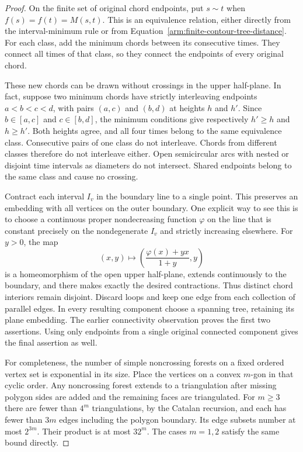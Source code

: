 \begin{proof}
On the finite set of original chord endpoints, put $s\sim t$ when
$f(s)=f(t)=M(s,t)$.  This is an equivalence relation, either directly
from the interval-minimum rule or from
Equation~\eqref{arm:finite-contour-tree-distance}.  For each class, add
the minimum chords between its consecutive times.  They connect all
times of that class, so they connect the endpoints of every original
chord.

These new chords can be drawn without crossings in the upper half-plane.
In fact, suppose two minimum chords have strictly interleaving endpoints
$a<b<c<d$, with pairs $(a,c)$ and $(b,d)$ at heights $h$ and $h'$.  Since
$b\in[a,c]$ and $c\in[b,d]$, the minimum conditions give respectively
$h'\ge h$ and $h\ge h'$.  Both heights agree, and all four times belong
to the same equivalence class.  Consecutive pairs of one class do not
interleave.  Chords from different classes therefore do not interleave
either.  Open semicircular arcs with nested or disjoint time intervals
as diameters do not intersect.  Shared
endpoints belong to the same class and cause no crossing.

Contract each interval $I_v$ in the boundary line to a single point.
This preserves an embedding with all vertices on the outer boundary.
One explicit way to see this is to choose a continuous proper
nondecreasing function $\varphi$ on the line that is constant precisely
on the nondegenerate $I_v$ and strictly increasing elsewhere.  For
$y>0$, the map
\[
 (x,y)\longmapsto
 \left(\frac{\varphi(x)+yx}{1+y},y\right)
\]
is a homeomorphism of the open upper half-plane, extends continuously
to the boundary, and there makes exactly the desired contractions.
Thus distinct chord interiors remain disjoint.  Discard loops and keep
one edge from each collection of parallel edges.  In every resulting
component choose a spanning tree, retaining its plane embedding.  The
earlier connectivity observation proves the first two assertions.
Using only endpoints from a single original connected component gives
the final assertion as well.

For completeness, the number of simple noncrossing forests on a fixed
ordered vertex set is exponential in its size.  Place the vertices on a
convex $m$-gon in that cyclic order.  Any noncrossing forest extends to a
triangulation after missing polygon sides are added and the remaining
faces are triangulated.  For $m\ge3$ there are fewer than $4^m$
triangulations, by the Catalan recursion, and each has fewer than $3m$
edges including the polygon boundary.  Its edge subsets number at most
$2^{3m}$.  Their product is at most $32^m$.  The cases $m=1,2$ satisfy
the same bound directly.
\end{proof}

